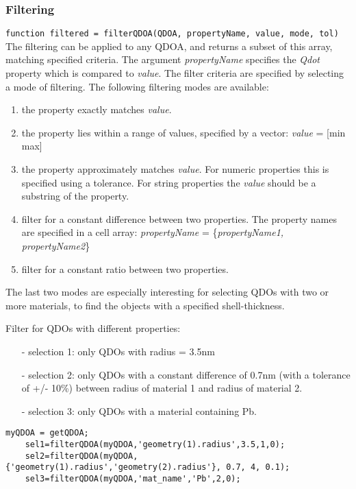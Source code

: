 \subsubsection{Filtering}
\lstinline{function filtered = filterQDOA(QDOA, propertyName, value, mode, tol)}\\

The filtering can be applied to any QDOA, and returns a subset of this array, matching specified criteria. The argument \textit{propertyName} specifies the \textit{Qdot} property which is compared to \textit{value}. The filter criteria are specified by selecting a mode of filtering. The following filtering modes are available:

\begin{enumerate}
	\item the property exactly matches \textit{value}.
	\item the property lies within a range of values, specified by a vector: \textit{value} = [min max]
	\item the property approximately matches \textit{value}. For numeric properties this is specified using a tolerance. For string properties the \textit{value} should be a substring of the property.
	\item filter for a constant difference between two properties. The property names are specified in a cell array: \textit{propertyName} 
	= \{\textit{propertyName1, propertyName2}\}
	\item filter for a constant ratio between two properties.
\end{enumerate}
The last two modes are especially interesting for selecting QDOs with two or more materials, to find the objects with a specified shell-thickness.\\

\begin{EXAMPLE}
	Filter for QDOs with different properties:
	\begin{itemize}
	\item[-] selection 1: only QDOs with radius = 3.5nm
	\item[-] selection 2: only QDOs with a constant difference of 0.7nm (with a tolerance of +/- 10\%) between radius of material 1 and radius of material 2.
	\item[-] selection 3: only QDOs with a material containing Pb.
	\end{itemize}
	\begin{lstlisting}[frame = none]
	myQDOA = getQDOA;
	sel1=filterQDOA(myQDOA,'geometry(1).radius',3.5,1,0);
	sel2=filterQDOA(myQDOA,{'geometry(1).radius','geometry(2).radius'}, 0.7, 4, 0.1);
	sel3=filterQDOA(myQDOA,'mat_name','Pb',2,0); \end{lstlisting}
\end{EXAMPLE}
